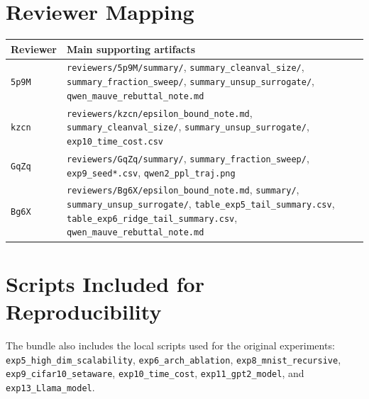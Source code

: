 \documentclass[11pt]{article}
\begin{document}
\section*{Reviewer Mapping}
\begin{tabularx}{\linewidth}{>{\raggedright\arraybackslash}p{1.8cm} X}
\toprule
\textbf{Reviewer} & \textbf{Main supporting artifacts} \\
\midrule
\texttt{5p9M} & \texttt{reviewers/5p9M/summary/}, \texttt{summary\_cleanval\_size/}, \texttt{summary\_fraction\_sweep/}, \texttt{summary\_unsup\_surrogate/}, \texttt{qwen\_mauve\_rebuttal\_note.md} \\
\texttt{kzcn} & \texttt{reviewers/kzcn/epsilon\_bound\_note.md}, \texttt{summary\_cleanval\_size/}, \texttt{summary\_unsup\_surrogate/}, \texttt{exp10\_time\_cost.csv} \\
\texttt{GqZq} & \texttt{reviewers/GqZq/summary/}, \texttt{summary\_fraction\_sweep/}, \texttt{exp9\_seed*.csv}, \texttt{qwen2\_ppl\_traj.png} \\
\texttt{Bg6X} & \texttt{reviewers/Bg6X/epsilon\_bound\_note.md}, \texttt{summary/}, \texttt{summary\_unsup\_surrogate/}, \texttt{table\_exp5\_tail\_summary.csv}, \texttt{table\_exp6\_ridge\_tail\_summary.csv}, \texttt{qwen\_mauve\_rebuttal\_note.md} \\
\bottomrule
\end{tabularx}

\section*{Scripts Included for Reproducibility}
The bundle also includes the local scripts used for the original experiments:
\texttt{exp5\_high\_dim\_scalability},
\texttt{exp6\_arch\_ablation},
\texttt{exp8\_mnist\_recursive},
\texttt{exp9\_cifar10\_setaware},
\texttt{exp10\_time\_cost},
\texttt{exp11\_gpt2\_model},
and \texttt{exp13\_Llama\_model}.
\end{document}
